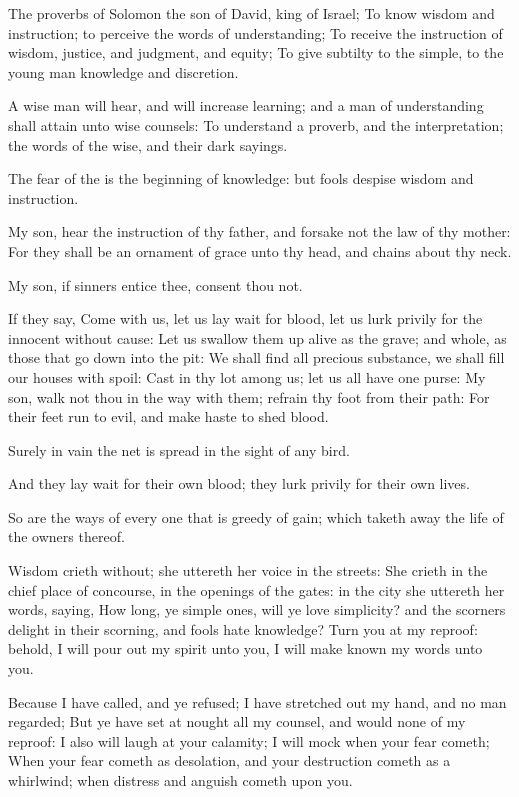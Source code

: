 \Chapter
\Verse The proverbs of Solomon the son of David, king of Israel; \Verse To know wisdom and instruction; to perceive the words of understanding; \Verse To receive the instruction of wisdom, justice, and judgment, and equity; \Verse To give subtilty to the simple, to the young man knowledge and discretion.

\Verse A wise man will hear, and will increase learning; and a man of understanding shall attain unto wise counsels: \Verse To understand a proverb, and the interpretation; the words of the wise, and their dark sayings.

\Verse The fear of the \LORD is the beginning of knowledge: but fools despise wisdom and instruction.

\Verse My son, hear the instruction of thy father, and forsake not the law of thy mother: \Verse For they shall be an ornament of grace unto thy head, and chains about thy neck.

\Verse My son, if sinners entice thee, consent thou not.

\Verse If they say, Come with us, let us lay wait for blood, let us lurk privily for the innocent without cause: \Verse Let us swallow them up alive as the grave; and whole, as those that go down into the pit: \Verse We shall find all precious substance, we shall fill our houses with spoil: \Verse Cast in thy lot among us; let us all have one purse: \Verse My son, walk not thou in the way with them; refrain thy foot from their path: \Verse For their feet run to evil, and make haste to shed blood.

\Verse Surely in vain the net is spread in the sight of any bird.

\Verse And they lay wait for their own blood; they lurk privily for their own lives.

\Verse So are the ways of every one that is greedy of gain; which taketh away the life of the owners thereof.

\Verse Wisdom crieth without; she uttereth her voice in the streets: \Verse She crieth in the chief place of concourse, in the openings of the gates: in the city she uttereth her words, saying, \Verse How long, ye simple ones, will ye love simplicity? and the scorners delight in their scorning, and fools hate knowledge?  \Verse Turn you at my reproof: behold, I will pour out my spirit unto you, I will make known my words unto you.

\Verse Because I have called, and ye refused; I have stretched out my hand, and no man regarded; \Verse But ye have set at nought all my counsel, and would none of my reproof: \Verse I also will laugh at your calamity; I will mock when your fear cometh; \Verse When your fear cometh as desolation, and your destruction cometh as a whirlwind; when distress and anguish cometh upon you.

